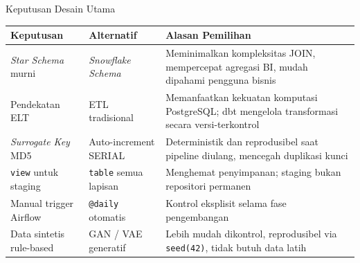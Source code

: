 \documentclass[xcolor=table,t,aspectratio=169]{beamer}
\begin{document}
\begin{frame}{Keputusan Desain Utama}
  \scriptsize
  \begin{tabular}{@{}p{2.8cm}p{2.8cm}p{6.8cm}@{}}
    \toprule
    \textbf{Keputusan} & \textbf{Alternatif} & \textbf{Alasan Pemilihan} \\
    \midrule
    \textit{Star Schema} murni
      & \textit{Snowflake Schema}
      & Meminimalkan kompleksitas JOIN, mempercepat agregasi BI, mudah dipahami pengguna bisnis \\[3pt]
    Pendekatan ELT
      & ETL tradisional
      & Memanfaatkan kekuatan komputasi PostgreSQL; dbt mengelola transformasi secara versi-terkontrol \\[3pt]
    \textit{Surrogate Key} MD5
      & Auto-increment SERIAL
      & Deterministik dan reprodusibel saat pipeline diulang, mencegah duplikasi kunci \\[3pt]
    \texttt{view} untuk staging
      & \texttt{table} semua lapisan
      & Menghemat penyimpanan; staging bukan repositori permanen \\[3pt]
    Manual trigger Airflow
      & \texttt{@daily} otomatis
      & Kontrol eksplisit selama fase pengembangan \\[3pt]
    Data sintetis rule-based
      & GAN / VAE generatif
      & Lebih mudah dikontrol, reprodusibel via \texttt{seed(42)}, tidak butuh data latih \\
    \bottomrule
  \end{tabular}
\end{frame}
\end{document}
